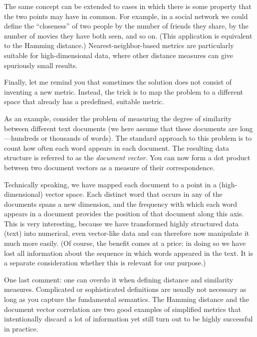 The same concept can be extended to cases in which there is some
property that the two points may have in common. For example, in a
social network we could define the ``closeness'' of two people by the
number of friends they share, by the number of movies they have both
seen, and so on. (This application is equivalent to the Hamming
distance.) Nearest-neighbor-based metrics are particularly suitable
for high-dimensional data, where other distance measures can give
spuriously small results.


Finally, let me remind you that sometimes the solution does not
consist of inventing a new metric. Instead, the trick is to map the
problem to a different space that already has a predefined, suitable
metric.

As an example, consider the problem of measuring the degree of
similarity between different text documents (we here assume that these
documents are long---hundreds or thousands of words). The standard
approach to this problem is to count how often each word appears in
each document. The resulting data structure is referred to as the
\emph{document vector}. You can now form a dot product between two
document vectors as a measure of their correspondence.

Technically speaking, we have mapped each document to a point in a
(high-dimensional) vector space. Each distinct word that occurs in any
of the documents spans a new dimension, and the frequency with which
each word appears in a document provides the position of that document
along this axis.  This is very interesting, because we have
transformed highly structured data (text) into numerical, even
vector-like data and can therefore now manipulate it much more easily.
(Of course, the benefit comes at a price: in doing so we have lost all
information about the sequence in which words appeared in the text. It
is a separate consideration whether this is relevant for our purpose.)

One last comment: one can overdo it when defining distance and
similarity measures. Complicated or sophisticated definitions are
usually not necessary as long as you capture the fundamental
semantics. The Hamming distance and the document vector correlation
are two good examples of simplified metrics that intentionally discard
a lot of information yet still turn out to be highly successful in
practice.

